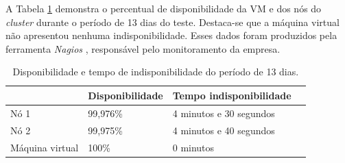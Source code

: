 A Tabela \ref{tab:teste3disp} demonstra o percentual de disponibilidade da \ac{VM} e dos nós do \textit{cluster} durante o período de 13 dias
do teste. Destaca-se que a máquina virtual não apresentou nenhuma indisponibilidade. 
Esses dados foram produzidos pela ferramenta \textit{Nagios} \cite{nagios}, responsável pelo monitoramento da empresa.

\begin{table}[h!]
\caption{Disponibilidade e tempo de indisponibilidade do período de 13 dias.}
\label{tab:teste3disp}
\begin{center}
\begin{tabular}{|l|l|p{4cm}|l|}\hline
 & \textbf{Disponibilidade} & \textbf{Tempo indisponibilidade} \\\hline
Nó 1 & 99,976\% & 4 minutos e 30 segundos \\\hline
Nó 2 & 99,975\% & 4 minutos e 40 segundos \\\hline
Máquina virtual & 100\% & 0 minutos \\\hline
\end{tabular}
\end{center}
\end{table}


% 

